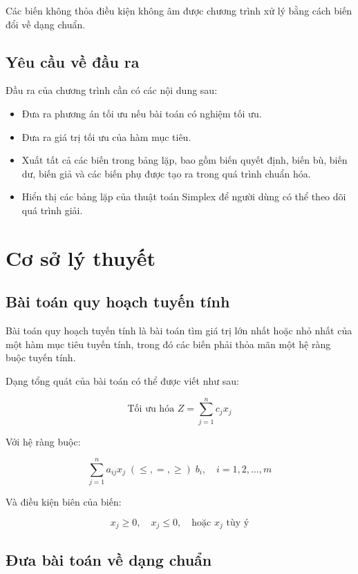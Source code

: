 \documentclass[14pt, a4paper]{extarticle}
\begin{document}
    Các biến không thỏa điều kiện không âm được chương trình xử lý bằng cách biến đổi về dạng chuẩn.
    
    \subsection{Yêu cầu về đầu ra}
    Đầu ra của chương trình cần có các nội dung sau:
    \begin{itemize}
        \item Đưa ra phương án tối ưu nếu bài toán có nghiệm tối ưu.
        \item Đưa ra giá trị tối ưu của hàm mục tiêu.
        \item Xuất tất cả các biến trong bảng lặp, bao gồm biến quyết định, biến bù, biến dư, biến giả và các biến phụ được tạo ra trong quá trình chuẩn hóa.
        \item Hiển thị các bảng lặp của thuật toán Simplex để người dùng có thể theo dõi quá trình giải.
    \end{itemize}
    
    \section{Cơ sở lý thuyết}
    
    \subsection{Bài toán quy hoạch tuyến tính}
    
    Bài toán quy hoạch tuyến tính là bài toán tìm giá trị lớn nhất hoặc nhỏ nhất của một hàm mục tiêu tuyến tính, trong đó các biến phải thỏa mãn một hệ ràng buộc tuyến tính.
    
    Dạng tổng quát của bài toán có thể được viết như sau:
    
    \[
    \text{Tối ưu hóa } Z = \sum_{j=1}^{n} c_jx_j
    \]
    
    Với hệ ràng buộc:
    
    \[
    \sum_{j=1}^{n} a_{ij}x_j \; (\leq, =, \geq) \; b_i, \quad i = 1,2,\ldots,m
    \]
    
    Và điều kiện biên của biến:
    
    \[
    x_j \geq 0, \quad x_j \leq 0, \quad \text{hoặc } x_j \text{ tùy ý}
    \]
    
    \subsection{Đưa bài toán về dạng chuẩn}
    
\end{document}
